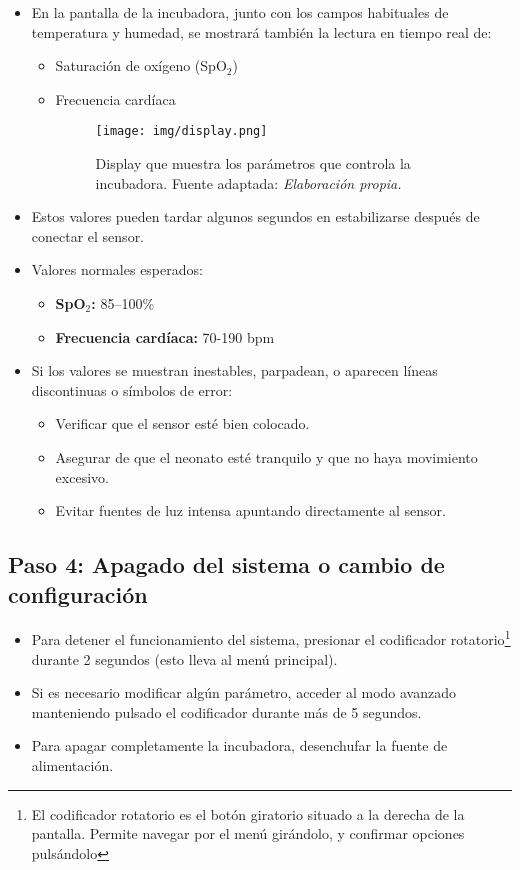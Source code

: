 \begin{itemize}
    \item En la pantalla de la incubadora, junto con los campos habituales de temperatura y humedad, se mostrará también la lectura en tiempo real de:
        \begin{itemize}
            \item Saturación de oxígeno (SpO$_2$)
            \item Frecuencia cardíaca 
            \begin{figure}[H]
            \centering
            \texttt{[image: img/display.png]}
            \caption{Display que muestra los parámetros que controla la incubadora. Fuente adaptada: \textit{Elaboración propia.}}
            \label{fig:display}
            \end{figure}
        \end{itemize}
    \item Estos valores pueden tardar algunos segundos en estabilizarse después de conectar el sensor.
    \item Valores normales esperados:
        \begin{itemize}
            \item \textbf{SpO$_2$:} 85–100\%
            \item \textbf{Frecuencia cardíaca:} 70-190 bpm
        \end{itemize}
    \item Si los valores se muestran inestables, parpadean, o aparecen líneas discontinuas o símbolos de error:
        \begin{itemize}
            \item Verificar que el sensor esté bien colocado.
            \item Asegurar de que el neonato esté tranquilo y que no haya movimiento excesivo.
            \item Evitar fuentes de luz intensa apuntando directamente al sensor.
        \end{itemize}
\end{itemize}

\subsection{Paso 4: Apagado del sistema o cambio de configuración}

\begin{itemize}
    \item Para detener el funcionamiento del sistema, presionar el codificador rotatorio\footnote{El codificador rotatorio es el botón giratorio situado a la derecha de la pantalla. Permite navegar por el menú girándolo, y confirmar opciones pulsándolo } durante 2 segundos (esto lleva al menú principal).
    \item Si es necesario modificar algún parámetro, acceder al modo avanzado manteniendo pulsado el codificador durante más de 5 segundos.
    \item Para apagar completamente la incubadora, desenchufar la fuente de alimentación.
\end{itemize}

